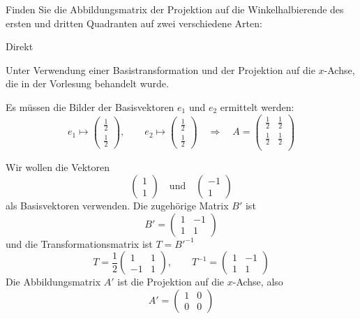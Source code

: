 Finden Sie die Abbildungsmatrix der Projektion auf die Winkelhalbierende
des ersten und dritten Quadranten auf zwei verschiedene Arten:
\begin{teilaufgaben}
\item Direkt
\item Unter Verwendung einer Basistransformation und der Projektion auf
die $x$-Achse, die in der Vorlesung behandelt wurde.
\end{teilaufgaben}

\begin{loesung}
\begin{teilaufgaben}
\item Es müssen die Bilder der Basisvektoren $e_1$ und $e_2$ ermittelt
werden:
\[
e_1\mapsto\begin{pmatrix}\frac{1}2\\\frac{1}2\end{pmatrix}
,\qquad
e_2\mapsto\begin{pmatrix}\frac{1}2\\\frac{1}2\end{pmatrix}
\quad
\Rightarrow
\quad
A=\begin{pmatrix}
\frac{1}2&
\frac{1}2\\
\frac{1}2&
\frac{1}2\\
\end{pmatrix}
\]
\item
Wir wollen die Vektoren
\[
\begin{pmatrix}1\\1\end{pmatrix}
\quad\text{und}\quad
\begin{pmatrix}-1\\1\end{pmatrix}
\]
als Basisvektoren verwenden. Die zugehörige Matrix $B'$ ist
\[
B'=
\begin{pmatrix}
1&-1\\
1&1
\end{pmatrix}
\]
und die Transformationsmatrix ist $T=B'^{-1}$
\[
T=
\frac12\begin{pmatrix}
1&1\\
-1&1
\end{pmatrix}
,\qquad
T^{-1}=
\begin{pmatrix}
1&-1\\
1&1
\end{pmatrix}
\]
Die Abbildungsmatrix $A'$ ist die Projektion auf die $x$-Achse,
also
\[
A'=
\begin{pmatrix}
1&0\\
0&0

\end{pmatrix}\]
\end{teilaufgaben}
\end{loesung}

